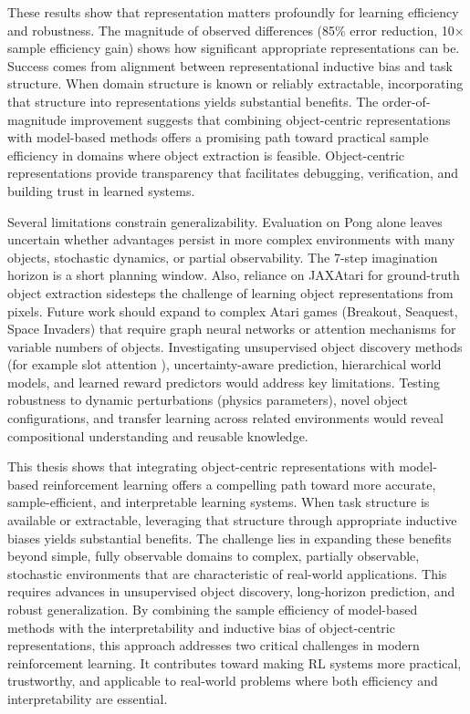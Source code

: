 \documentclass[
	english,
	ruledheaders=section,
	class=report,
	thesis={type=master},
	accentcolor=9c,
	custommargins=true,
	marginpar=false,
	parskip=half-,
	fontsize=11pt,
	pdfa=true,
]{tudapub}
\newcommand{\worldmodel}{world model}
\begin{document}
These results show that representation matters profoundly for learning
efficiency and robustness. The magnitude of observed differences (85\% error
reduction, 10× sample efficiency gain) shows how significant appropriate
representations can be. Success comes from alignment between representational
inductive bias and task structure. When domain structure is known or reliably
extractable, incorporating that structure into representations yields
substantial benefits. The order-of-magnitude improvement suggests that
combining object-centric representations with model-based methods offers a
promising path toward practical sample efficiency in domains where object
extraction is feasible. Object-centric representations provide transparency
that facilitates debugging, verification, and building trust in learned
systems.

Several limitations constrain generalizability. Evaluation on Pong alone leaves
uncertain whether advantages persist in more complex environments with many
objects, stochastic dynamics, or partial observability. The 7-step imagination
horizon is a short planning window. Also, reliance on JAXAtari for ground-truth
object extraction sidesteps the challenge of learning object representations
from pixels. Future work should expand to complex Atari games (Breakout,
Seaquest, Space Invaders) that require graph neural networks or attention
mechanisms for variable numbers of objects. Investigating unsupervised object
discovery methods (for example slot attention \cite{DBLP:conf/nips/LocatelloWUMHUD20}), uncertainty-aware prediction,
hierarchical \worldmodel{}s, and learned reward predictors would address key
limitations. Testing robustness to dynamic perturbations (physics parameters),
novel object configurations, and transfer learning across related environments
would reveal compositional understanding and reusable knowledge.

This thesis shows that integrating object-centric representations with
model-based reinforcement learning offers a compelling path toward more
accurate, sample-efficient, and interpretable learning systems. When task
structure is available or extractable, leveraging that structure through
appropriate inductive biases yields substantial benefits. The challenge lies in
expanding these benefits beyond simple, fully observable domains to complex,
partially observable, stochastic environments that are characteristic of
real-world applications. This requires advances in unsupervised object
discovery, long-horizon prediction, and robust generalization. By combining the
sample efficiency of model-based methods with the interpretability and
inductive bias of object-centric representations, this approach addresses two
critical challenges in modern reinforcement learning. It contributes toward
making RL systems more practical, trustworthy, and applicable to real-world
problems where both efficiency and interpretability are essential.
\end{document}
